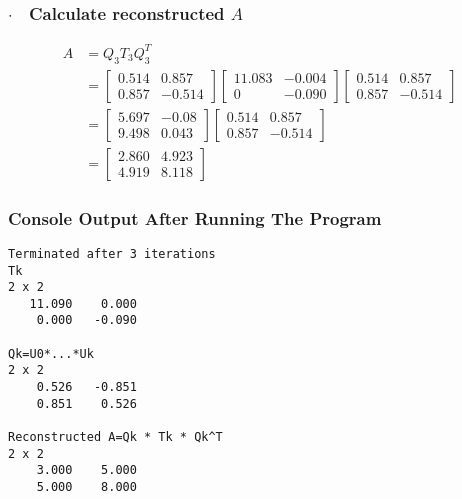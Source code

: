 \subsubsection{$\cdot\quad$Calculate reconstructed $A$}
\begin{align*}
    A &= Q_3 T_3 Q_3^T\\
    &= \begin{bmatrix}
        0.514 & 0.857\\
        0.857 & -0.514
    \end{bmatrix} \begin{bmatrix}
        11.083 & -0.004\\
        0 & -0.090
    \end{bmatrix} \begin{bmatrix}
        0.514 & 0.857\\
        0.857 & -0.514
    \end{bmatrix}\\
    &= \begin{bmatrix}
        5.697 & -0.08\\
        9.498 & 0.043
    \end{bmatrix} \begin{bmatrix}
        0.514 & 0.857\\
        0.857 & -0.514
    \end{bmatrix}\\
    &= \begin{bmatrix}
        2.860 & 4.923\\
        4.919 & 8.118
    \end{bmatrix}
\end{align*}

\subsubsection{Console Output After Running The Program}
\begin{verbatim}
Terminated after 3 iterations
Tk
2 x 2
   11.090    0.000
    0.000   -0.090

Qk=U0*...*Uk
2 x 2
    0.526   -0.851
    0.851    0.526

Reconstructed A=Qk * Tk * Qk^T
2 x 2
    3.000    5.000
    5.000    8.000

\end{verbatim}

